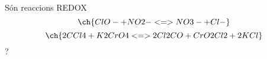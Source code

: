 \begin{exr}
Són reaccions REDOX
\[\ch{ClO- + NO2- <=> NO3- + Cl-} \]
\[\ch{2 CCl4 + K2CrO4 <=> 2 Cl2CO + CrO2Cl2 + 2 KCl} \]?
\end{exr}
